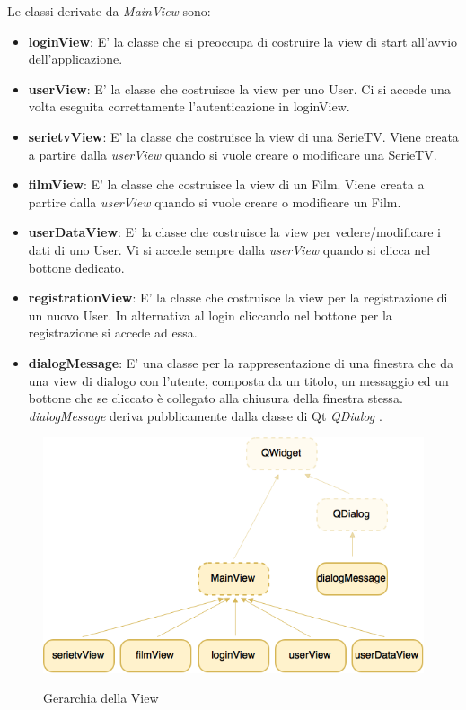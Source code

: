 \documentclass[10pt,a4paper,openany]{article}
\begin{document}
	Le classi derivate da \emph{MainView} sono:
	\begin{itemize}
		\item \textbf{loginView}: E' la classe che si preoccupa di costruire la view di start all'avvio dell'applicazione.
		\item \textbf{userView}: E' la classe che costruisce la view per uno User. Ci si accede una volta eseguita correttamente l'autenticazione in loginView.
		\item \textbf{serietvView}: E' la classe che costruisce la view di una SerieTV. Viene creata a partire dalla \emph{userView} quando si vuole creare o modificare 
		una SerieTV.
		\item \textbf{filmView}: E' la classe che costruisce la view di un Film. Viene creata a partire dalla \emph{userView} quando si vuole creare o modificare 
		un Film.
		\item \textbf{userDataView}: E' la classe che costruisce la view per vedere/modificare i dati di uno User. Vi si accede sempre dalla \emph{userView} quando
		si clicca nel bottone dedicato.
		\item \textbf{registrationView}: E' la classe che costruisce la view per la registrazione di un nuovo User.  In alternativa al login cliccando nel bottone per la 
		registrazione si accede ad essa.
		\item \textbf{dialogMessage}: E' una classe per la rappresentazione di una finestra che da una view di dialogo con l'utente, composta da un titolo, un 
		messaggio ed un bottone che se cliccato è collegato alla chiusura della finestra stessa. \emph{dialogMessage} deriva pubblicamente dalla classe di Qt 
		\emph{QDialog} .
	\end{itemize}
		
		\newpage
		
		
		\begin{figure}[!h]
			\centering
			\includegraphics[angle=0,scale=.45]{View.png}\\
			\caption{Gerarchia della View}
			\label{fig:View}
		\end{figure}
	
\end{document}
